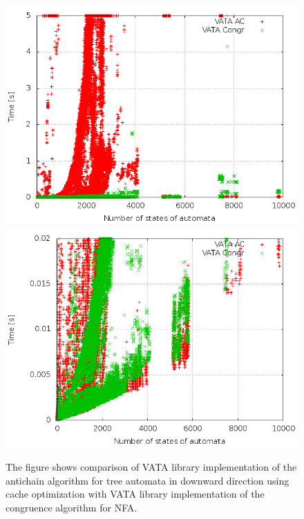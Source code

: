 \begin{figure}[t]
\begin{center}
\includegraphics[scale=0.3]{fig/plot_ca_zprava.png}
\includegraphics[scale=0.3]{fig/plot_ca_step_zprava.png}
\caption{The figure shows
 comparison of VATA library implementation of the antichain algorithm for tree automata in downward direction using cache optimization 
 with VATA library implementation of the congruence algorithm for NFA.}
\label{fig:figPlotCa}
\end{center}
\end{figure}

